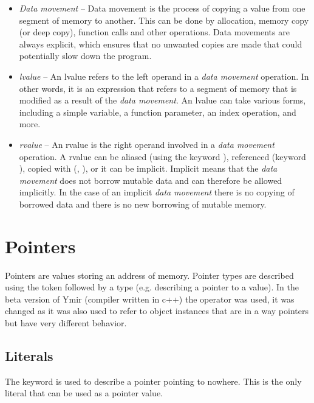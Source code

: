 \begin{itemize}
\item \textit{Data movement} -- Data movement is the process of copying a value
  from one segment of memory to another. This can be done by allocation, memory
  copy (or deep copy), function calls and other operations. Data movements are
  always explicit, which ensures that no unwanted copies are made that could
  potentially slow down the program.

\item \textit{lvalue} -- An lvalue refers to the left operand in a \textit{data
  movement} operation. In other words, it is an expression that refers to a
  segment of memory that is modified as a result of the \textit{data movement}.
  An lvalue can take various forms, including a simple variable, a function
  parameter, an index operation, and more.

\item \textit{rvalue} -- An rvalue is the right operand involved in a
  \textit{data movement} operation. A rvalue can be aliased (using the keyword
  ), referenced (keyword ), copied with
  (, ), or it can be implicit. Implicit means that
  the \textit{data movement} does not borrow mutable data and can therefore be
  allowed implicitly. In the case of an implicit \textit{data movement} there is
  no copying of borrowed data and there is no new borrowing of mutable memory.

\end{itemize}

\section{Pointers}%
\label{sec:pointer_type}

Pointers are values storing an address of memory. Pointer types are described
using the \token{*} token followed by a type (e.g.  describing a
pointer to a  value). In the beta version of Ymir (compiler written
in c++) the operator \token{\&} was used, it was changed as it was also used to
refer to object instances that are in a way pointers but have very different
behavior.

\subsection {Literals}

The keyword  is used to describe a pointer pointing to nowhere.
This is the only literal that can be used as a pointer value.

